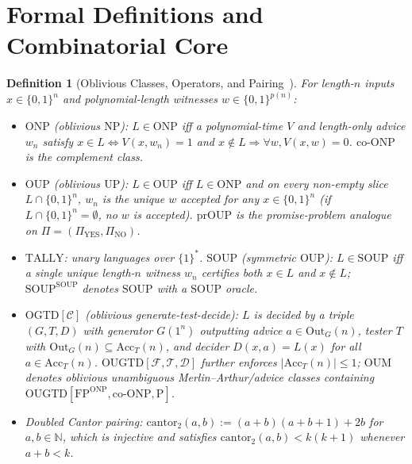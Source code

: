 \documentclass[10pt,twocolumn]{article}
\newtheorem{definition}{Definition}
\newcommand{\NN}{\mathbb{N}}
\newcommand{\OUP}{\mathrm{OUP}}
\newcommand{\ONP}{\mathrm{ONP}}
\newcommand{\SOUP}{\mathrm{SOUP}}
\newcommand{\OGTD}{\mathrm{OGTD}}
\newcommand{\OUGTD}{\mathrm{OUGTD}}
\newcommand{\OUM}{\mathrm{OUM}}
\begin{document}
\section{Formal Definitions and Combinatorial Core}\label{sec:prelim}

\begin{definition}[Oblivious Classes, Operators, and Pairing~\cite{hirsch2026oblivious}]\label{def:classes}
For length-$n$ inputs $x \in \{0,1\}^n$ and polynomial-length witnesses $w \in \{0,1\}^{p(n)}$:
\begin{itemize}[leftmargin=*,nosep]
  \item $\ONP$ (oblivious $\mathrm{NP}$): $L \in \ONP$ iff a polynomial-time $V$ and length-only advice $w_n$ satisfy $x \in L \iff V(x, w_n)=1$ and $x \notin L \Rightarrow \forall w, V(x,w)=0$. $\mathrm{co}\text{-}\ONP$ is the complement class.
  \item $\OUP$ (oblivious $\mathrm{UP}$): $L \in \OUP$ iff $L \in \ONP$ and on every non-empty slice $L \cap \{0,1\}^n$, $w_n$ is the \emph{unique} $w$ accepted for any $x \in \{0,1\}^n$ (if $L \cap \{0,1\}^n = \emptyset$, no $w$ is accepted). $\mathrm{prOUP}$ is the promise-problem analogue on $\Pi = (\Pi_{\mathrm{YES}}, \Pi_{\mathrm{NO}})$.
  \item $\mathrm{TALLY}$: unary languages over $\{1\}^\ast$. $\SOUP$ (symmetric $\OUP$): $L \in \SOUP$ iff a single unique length-$n$ witness $w_n$ certifies \emph{both} $x \in L$ and $x \notin L$; $\SOUP^{\SOUP}$ denotes $\SOUP$ with a $\SOUP$ oracle.
  \item $\OGTD[\mathcal{C}]$ (oblivious generate-test-decide): $L$ is decided by a triple $(G, T, D)$ with generator $G(1^n)$ outputting advice $a \in \mathrm{Out}_G(n)$, tester $T$ with $\mathrm{Out}_G(n) \subseteq \mathrm{Acc}_T(n)$, and decider $D(x, a) = L(x)$ for all $a \in \mathrm{Acc}_T(n)$. $\OUGTD[\mathcal{F}, \mathcal{T}, \mathcal{D}]$ further enforces $|\mathrm{Acc}_T(n)| \le 1$; $\OUM$ denotes oblivious unambiguous Merlin--Arthur/advice classes containing $\OUGTD[\mathrm{FP}^{\ONP}, \mathrm{co}\text{-}\ONP, \mathrm{P}]$.
  \item Doubled Cantor pairing: $\mathrm{cantor}_2(a, b) := (a+b)(a+b+1) + 2b$ for $a, b \in \NN$, which is injective and satisfies $\mathrm{cantor}_2(a, b) < k(k+1)$ whenever $a + b < k$.
\end{itemize}
\end{definition}
\end{document}
